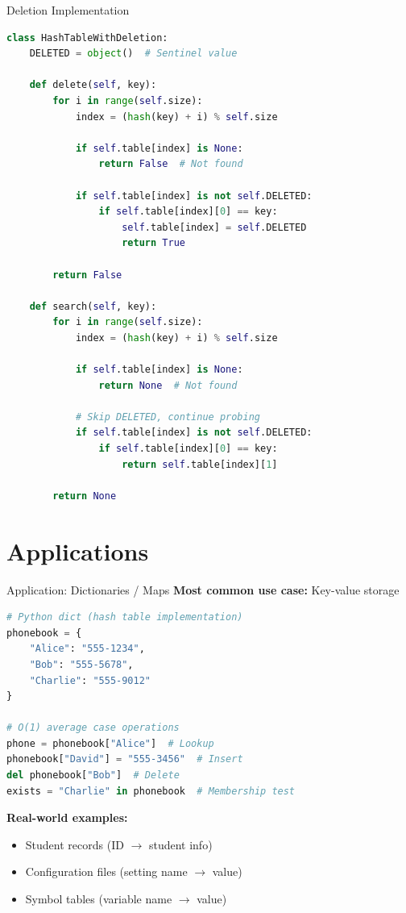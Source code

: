 \documentclass[aspectratio=169]{beamer}
\begin{document}
\begin{frame}[fragile]{Deletion Implementation}
  \begin{lstlisting}[language=Python, basicstyle=\ttfamily\footnotesize]
class HashTableWithDeletion:
    DELETED = object()  # Sentinel value

    def delete(self, key):
        for i in range(self.size):
            index = (hash(key) + i) % self.size

            if self.table[index] is None:
                return False  # Not found

            if self.table[index] is not self.DELETED:
                if self.table[index][0] == key:
                    self.table[index] = self.DELETED
                    return True

        return False

    def search(self, key):
        for i in range(self.size):
            index = (hash(key) + i) % self.size

            if self.table[index] is None:
                return None  # Not found

            # Skip DELETED, continue probing
            if self.table[index] is not self.DELETED:
                if self.table[index][0] == key:
                    return self.table[index][1]

        return None
  \end{lstlisting}
\end{frame}

\section{Applications}

\begin{frame}[fragile]{Application: Dictionaries / Maps}
  \textbf{Most common use case:} Key-value storage

  \begin{lstlisting}[language=Python, basicstyle=\ttfamily\small]
# Python dict (hash table implementation)
phonebook = {
    "Alice": "555-1234",
    "Bob": "555-5678",
    "Charlie": "555-9012"
}

# O(1) average case operations
phone = phonebook["Alice"]  # Lookup
phonebook["David"] = "555-3456"  # Insert
del phonebook["Bob"]  # Delete
exists = "Charlie" in phonebook  # Membership test
  \end{lstlisting}

  \vspace{0.3cm}
  \textbf{Real-world examples:}
  \begin{itemize}
    \item Student records (ID $\rightarrow$ student info)
    \item Configuration files (setting name $\rightarrow$ value)
    \item Symbol tables (variable name $\rightarrow$ value)
  \end{itemize}
\end{frame}
\end{document}
